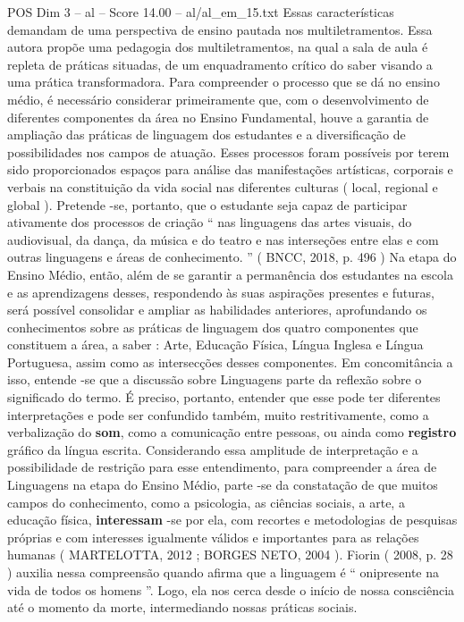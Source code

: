 \begin{textsample}{POS Dim 3 – al – Score 14.00 – al/al\_em\_15.txt}
Essas características demandam de uma perspectiva de ensino pautada nos multiletramentos.
Essa autora propõe uma pedagogia dos multiletramentos, na qual a sala de aula é repleta de práticas situadas, de um enquadramento crítico do saber visando a uma prática transformadora.
Para compreender o processo que se dá no ensino médio, é necessário considerar primeiramente que, com o desenvolvimento de diferentes componentes da área no Ensino Fundamental, houve a garantia de ampliação das práticas de linguagem dos estudantes e a diversificação de possibilidades nos campos de atuação.
Esses processos foram possíveis por terem sido proporcionados espaços para análise das manifestações artísticas, corporais e verbais na constituição da vida social nas diferentes culturas ( local, regional e global ).
Pretende -se, portanto, que o estudante seja capaz de participar ativamente dos processos de criação “ nas linguagens das artes visuais, do audiovisual, da dança, da música e do teatro e nas interseções entre elas e com outras linguagens e áreas de conhecimento. ” ( BNCC, 2018, p. 496 ) Na etapa do Ensino Médio, então, além de se garantir a permanência dos estudantes na escola e as aprendizagens desses, respondendo às suas aspirações presentes e futuras, será possível consolidar e ampliar as habilidades anteriores, aprofundando os conhecimentos sobre as práticas de linguagem dos quatro componentes que constituem a área, a saber : Arte, Educação Física, Língua Inglesa e Língua Portuguesa, assim como as intersecções desses componentes.
Em concomitância a isso, entende -se que a discussão sobre Linguagens parte da reflexão sobre o significado do termo.
É preciso, portanto, entender que esse pode ter diferentes interpretações e pode ser confundido também, muito restritivamente, como a verbalização do \textbf{som}, como a comunicação entre pessoas, ou ainda como \textbf{registro} gráfico da língua escrita.
Considerando essa amplitude de interpretação e a possibilidade de restrição para esse entendimento, para compreender a área de Linguagens na etapa do Ensino Médio, parte -se da constatação de que muitos campos do conhecimento, como a psicologia, as ciências sociais, a arte, a educação física, \textbf{interessam} -se por ela, com recortes e metodologias de pesquisas próprias e com interesses igualmente válidos e importantes para as relações humanas ( MARTELOTTA, 2012 ; BORGES NETO, 2004 ).
Fiorin ( 2008, p. 28 ) auxilia nessa compreensão quando afirma que a linguagem é “ onipresente na vida de todos os homens ”.
Logo, ela nos cerca desde o início de nossa consciência até o momento da morte, intermediando nossas práticas sociais.

\end{textsample}
